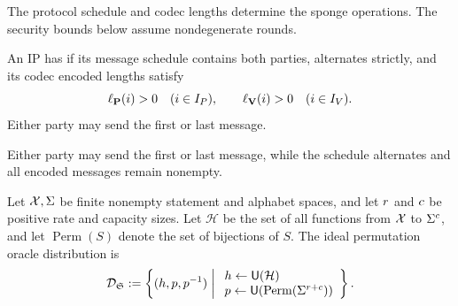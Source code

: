 The protocol schedule and codec lengths determine the sponge operations. The security bounds below assume nondegenerate rounds.

\begin{definition}
\label{def:dsfs_nondegenerate_rounds}
\leanok
An IP has  if its message schedule contains both parties, alternates strictly, and its codec encoded lengths satisfy
\begin{equation*}
  \ell_{\mathbf{P}}(i)>0\quad(i\in I_P),\qquad
  \ell_{\mathbf{V}}(i)>0\quad(i\in I_V).
\end{equation*}
Either party may send the first or last message.
\end{definition}

\begin{remark}
  \label{rem:dsfs_nondegenerate_rounds_comparison}
Either party may send the first or last message, while the schedule alternates and all encoded messages remain nonempty.
\end{remark}

\begin{definition}
\label{def:dsfs_oracle_distribution}
Let \(\mathcal X,\Sigma\) be finite nonempty statement and alphabet spaces, and let \(r\) and \(c\) be positive rate and capacity sizes. Let \(\mathcal H\) be the set of all functions from \(\mathcal X\) to \(\Sigma^{c}\), and let \(\operatorname{Perm}(S)\) denote the set of bijections of \(S\). The ideal permutation oracle distribution is
\begin{equation*}
\mathcal{D}_{\mathfrak S}:=
\left\{
  (h,p,p^{-1})
  \;\middle|\;
  \begin{array}{l}
    h\leftarrow\mathsf{U}(\mathcal H)\\
    p\leftarrow\mathsf{U}(\operatorname{Perm}(\Sigma^{r+c}))
  \end{array}
\right\}.
\end{equation*}
\leanok
\end{definition}

